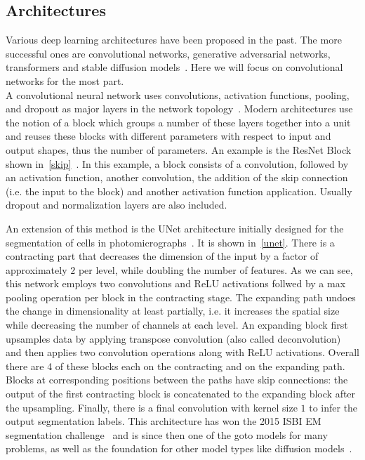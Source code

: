\subsection{Architectures}
Various deep learning architectures have been proposed in the past.
The more successful ones are convolutional networks, generative adversarial networks, transformers and stable diffusion models~\autocite{vaswani_attention_2017, goodfellow_generative_2020, krizhevsky_imagenet_2012, sohl-dickstein_deep_2015, lecun_handwritten_1989}.
Here we will focus on convolutional networks for the most part. \\

A convolutional neural network uses convolutions, activation functions, pooling, and dropout as major layers in the network topology~\autocite{goodfellow_deep_2016}.
Modern architectures use the notion of a block which groups a number of these layers together into a unit and reuses these blocks with different parameters with respect to input and output shapes, thus the number of parameters.
An example is the ResNet Block shown in~\ref{skip}~\autocite{he_deep_2016}.
In this example, a block consists of a convolution, followed by an activation function, another convolution, the addition of the skip connection (i.e. the input to the block) and another activation function application.
Usually dropout and normalization layers are also included. \\

An extension of this method is the UNet architecture initially designed for the segmentation of cells in photomicrographs~\autocite{ronneberger_u-net_2015}.
It is shown in~\ref{unet}.
There is a contracting part that decreases the dimension of the input by a factor of approximately $2$ per level, while doubling the number of features.
As we can see, this network employs two convolutions and ReLU activations follwed by a max pooling operation per block in the contracting stage.
The expanding path undoes the change in dimensionality at least partially, i.e. it increases the spatial size while decreasing the number of channels at each level.
An expanding block first upsamples data by applying transpose convolution (also called deconvolution) and then applies two convolution operations along with ReLU activations.
Overall there are 4 of these blocks each on the contracting and on the expanding path.
Blocks at corresponding positions between the paths have skip connections: the output of the first contracting block is concatenated to the expanding block after the upsampling.
Finally, there is a final convolution with kernel size $1$ to infer the output segmentation labels.
This architecture has won the 2015 ISBI EM segmentation challenge~\autocite{noauthor_segmentation_nodate} and is since then one of the goto models for many problems, as well as the foundation for other model types like diffusion models~\autocite{rombach_high-resolution_2022}.

